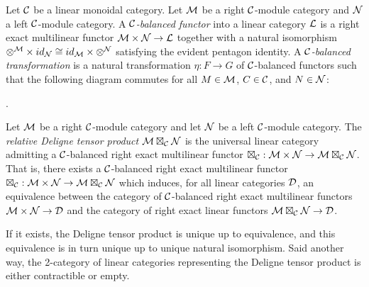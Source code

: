 \documentclass{amsart}
\begin{document}
\begin{definition}
	Let $\mathcal C$ be a linear monoidal category. 
	Let $\mathcal M$ be a right $\mathcal C$-module category and $\mathcal N$ a left $\mathcal C$-module category. A {\em $\mathcal C$-balanced functor} into a linear category $\mathcal L$ is a right exact multilinear functor $\mathcal M \times \mathcal N \to \mathcal L$ together with a natural isomorphism $\otimes^{\mathcal M} \times id_{\mathcal N} \cong id_{\mathcal M} \times \otimes^{\mathcal N}$ satisfying the evident pentagon identity. A {\em $\mathcal C$-balanced transformation} is a natural transformation $\eta:F \to G$ of $\mathcal C$-balanced functors such that the following diagram commutes for all $M \in \mathcal M$, $C \in \mathcal C$, and $N \in \mathcal N$:
\begin{center}
.
\end{center}
\end{definition}


\begin{definition}
	Let $\mathcal M$ be a right $\mathcal C$-module category and let $\mathcal N$ be a left $\mathcal C$-module category. The {\em relative Deligne tensor product $\mathcal M \boxtimes_{\mathcal C} \mathcal N$} 
	is the universal linear category admitting a $\mathcal C$-balanced right exact multilinear functor $\boxtimes_{\mathcal C}: \mathcal M \times \mathcal N \to \mathcal M \boxtimes_{\mathcal C} \mathcal N$. That is, there exists a $\mathcal C$-balanced right exact multilinear functor $\boxtimes_{\mathcal C}: \mathcal M \times \mathcal N \to \mathcal M \boxtimes_{\mathcal C} \mathcal N$ which induces, for all linear categories $\mathcal D$, an equivalence between the category of $\mathcal C$-balanced right exact multilinear functors $\mathcal M \times \mathcal N \to \mathcal D$ and the category of right exact linear functors $\mathcal M \boxtimes_{\mathcal C} \mathcal N \to \mathcal D$. 
\end{definition}

If it exists, the Deligne tensor product is unique up to equivalence, and this equivalence is in turn unique up to unique natural isomorphism. Said another way, the 2-category of linear categories representing the Deligne tensor product is either contractible or empty. 
\end{document}
